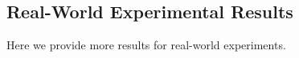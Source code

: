 
\clearpage
\subsection{Real-World Experimental Results}
\label{app:real_world}

Here we provide more results for real-world experiments. 










